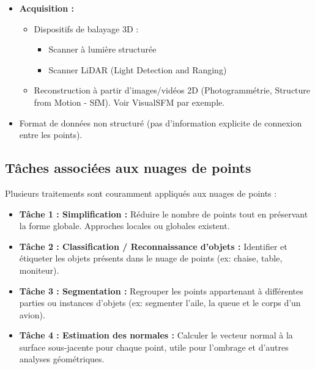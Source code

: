 \documentclass{article}
\begin{document}
\begin{itemize}
    \item \textbf{Acquisition :}
        \begin{itemize}
            \item Dispositifs de balayage 3D :
                \begin{itemize}
                    \item Scanner à lumière structurée
                    \item Scanner LiDAR (Light Detection and Ranging)
                \end{itemize}
            \item Reconstruction à partir d'images/vidéos 2D (Photogrammétrie, Structure from Motion - SfM). Voir VisualSFM par exemple.
        \end{itemize}
    \item Format de données non structuré (pas d'information explicite de connexion entre les points).
\end{itemize}

\subsection{Tâches associées aux nuages de points}

Plusieurs traitements sont couramment appliqués aux nuages de points :

\begin{itemize}
    \item \textbf{Tâche 1 : Simplification :} Réduire le nombre de points tout en préservant la forme globale. Approches locales ou globales existent.
    \item \textbf{Tâche 2 : Classification / Reconnaissance d'objets :} Identifier et étiqueter les objets présents dans le nuage de points (ex: chaise, table, moniteur).
    \item \textbf{Tâche 3 : Segmentation :} Regrouper les points appartenant à différentes parties ou instances d'objets (ex: segmenter l'aile, la queue et le corps d'un avion).
    \item \textbf{Tâche 4 : Estimation des normales :} Calculer le vecteur normal à la surface sous-jacente pour chaque point, utile pour l'ombrage et d'autres analyses géométriques.
\end{itemize}

\end{document}
